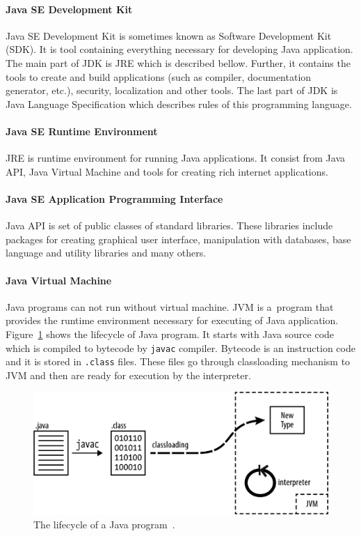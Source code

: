 \paragraph{Java SE Development Kit}
Java SE Development Kit is sometimes known as Software Development Kit (SDK). It is tool containing everything necessary
for developing Java application. The main part of JDK is JRE which is described bellow. Further, it contains the tools
to create and build applications (such as compiler, documentation generator, etc.), security, localization and other
tools. The last part of JDK is Java Language Specification which describes rules of this programming language.

\paragraph{Java SE Runtime Environment}
JRE is runtime environment for running Java applications. It consist from Java API, Java Virtual Machine and tools for
creating rich internet applications.

\paragraph{Java SE Application Programming Interface}
Java API is set of public classes of standard libraries. These libraries include packages for creating graphical user
interface, manipulation with databases, base language and utility libraries and many others.

\paragraph{Java Virtual Machine}
Java programs can not run without virtual machine. JVM is a~program that provides the runtime environment necessary for
executing of Java application. Figure~\ref{JavaLifecycle} shows the lifecycle of Java program. It starts with Java
source code which is compiled to bytecode by \texttt{javac} compiler. Bytecode is an instruction code and it is stored
in \texttt{.class} files. These files go through classloading mechanism to JVM and then are ready for execution by the
interpreter.

\begin{figure}[h!]
    \centering
    \includegraphics[scale=0.3]{fig/java_program_lifecycle.png}
    \caption{The lifecycle of a Java program~\cite{JavaBook}.}
    \label{JavaLifecycle}
\end{figure}
